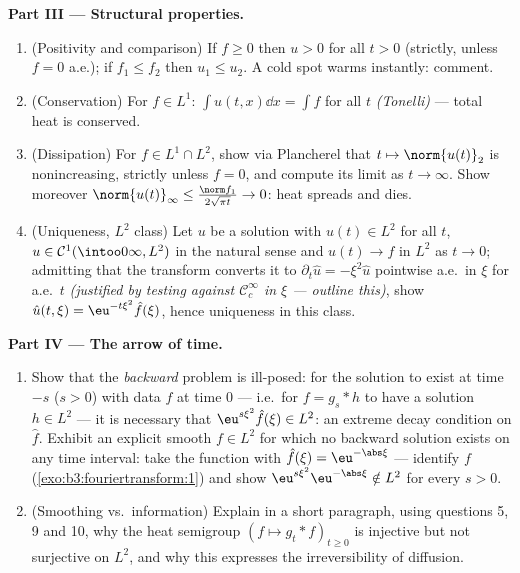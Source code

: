 \begin{problem}[{Weekend problem --- $\partial_tu =
\partial^2_{xx}u$, solved end to end}]
\medskip
\noindent\textbf{Part III --- Structural properties.}
\begin{enumerate}[resume]
  \item (Positivity and comparison) If $f \geq 0$ then $u > 0$
        for all $t > 0$ (strictly, unless $f = 0$ a.e.); if
        $f_1 \leq f_2$ then $u_1 \leq u_2$. A cold spot warms
        instantly: comment.
  \item (Conservation) For $f \in L^1$: $\int u(t, x)\dd x =
        \int f$ for all $t$ \emph{(Tonelli)} --- total heat is
        conserved.
  \item (Dissipation) For $f \in L^1\cap L^2$, show via
        Plancherel that $t \mapsto \norm{u(t)}_2$ is
        nonincreasing, strictly unless $f = 0$, and compute
        its limit as $t \to \infty$. Show moreover
        $\norm{u(t)}_\infty \leq \frac{\norm
        f_1}{2\sqrt{\pi t}} \to 0$: heat spreads and dies.
  \item (Uniqueness, $L^2$ class) Let $u$ be a solution with
        $u(t) \in L^2$ for all $t$, $u \in \mathcal
        C^1(\intoo0\infty, L^2)$ in the natural sense and
        $u(t) \to f$ in $L^2$ as $t\to0$; admitting that the
        transform converts it to $\partial_t\hat u =
        -\xi^2\hat u$ pointwise a.e.\ in $\xi$ for a.e.\ $t$
        \emph{(justified by testing against $\mathcal
        C_c^\infty$ in $\xi$ --- outline this)}, show
        $\hat u(t,\xi) = \eu^{-t\xi^2}\hat f(\xi)$, hence
        uniqueness in this class.
\end{enumerate}

\medskip
\noindent\textbf{Part IV --- The arrow of time.}
\begin{enumerate}[resume]
  \item Show that the \emph{backward} problem is ill-posed:
        for the solution to exist at time $-s$ ($s > 0$) with
        data $f$ at time $0$ --- i.e.\ for $f = g_s * h$ to
        have a solution $h \in L^2$ --- it is necessary that
        $\eu^{s\xi^2}\hat f(\xi) \in L^2$: an extreme decay
        condition on $\hat f$. Exhibit an explicit smooth $f
        \in L^2$ for which no backward solution exists on any
        time interval: take the function with $\hat f(\xi) =
        \eu^{-\abs\xi}$ --- identify $f$
        (\cref{exo:b3:fouriertransform:1}) and show
        $\eu^{s\xi^2}\eu^{-\abs\xi} \notin L^2$ for every $s >
        0$.
  \item (Smoothing vs.\ information) Explain in a short
        paragraph, using questions 5, 9 and 10, why the heat
        semigroup $(f \mapsto g_t * f)_{t\geq0}$ is injective
        but not surjective on $L^2$, and why this expresses
        the irreversibility of diffusion.
\end{enumerate}


\end{problem}
